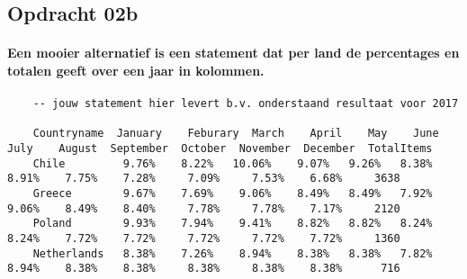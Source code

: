 \subsection{Opdracht 02b}

\paragraph{
Een mooier alternatief is een statement dat per land de percentages en totalen geeft over een jaar in kolommen.
}

\begin{lstlisting}
    -- jouw statement hier levert b.v. onderstaand resultaat voor 2017

    Countryname  January	Feburary  March    April    May    June    July    August  September  October  November  December  TotalItems
    Chile         9.76%    8.22%   10.06%    9.07%   9.26%   8.38%   8.91%    7.75%    7.28%     7.09%     7.53%    6.68%     3638
    Greece        9.67%    7.69%    9.06%    8.49%   8.49%   7.92%   9.06%    8.49%    8.40%     7.78%     7.78%    7.17%     2120
    Poland        9.93%    7.94%    9.41%    8.82%   8.82%   8.24%   8.24%    7.72%    7.72%     7.72%     7.72%    7.72%     1360
    Netherlands   8.38%    7.26%    8.94%    8.38%   8.38%   7.82%   8.94%    8.38%    8.38%     8.38%     8.38%    8.38%      716
\end{lstlisting}



